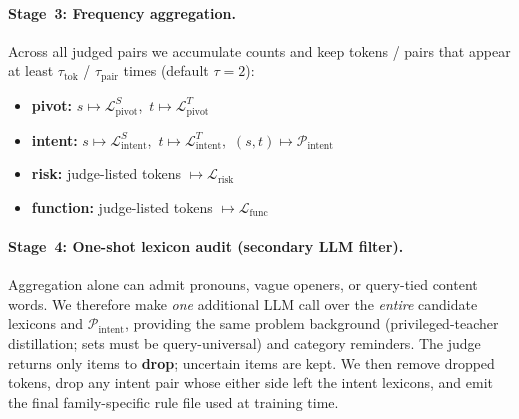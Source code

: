 \paragraph{Stage~3: Frequency aggregation.}
Across all judged pairs we accumulate counts and keep tokens / pairs that
appear at least $\tau_{\mathrm{tok}}$ / $\tau_{\mathrm{pair}}$ times
(default $\tau\!=\!2$):
\begin{itemize}[leftmargin=1.6em, topsep=3pt, itemsep=2pt, parsep=0pt]
  \item[\textbullet]
    \textbf{pivot:}
    $s\mapsto\mathcal{L}_{\mathrm{pivot}}^{S}$,\
    $t\mapsto\mathcal{L}_{\mathrm{pivot}}^{T}$
  \item[\textbullet]
    \textbf{intent:}
    $s\mapsto\mathcal{L}_{\mathrm{intent}}^{S}$,\
    $t\mapsto\mathcal{L}_{\mathrm{intent}}^{T}$,\
    $(s,t)\mapsto\mathcal{P}_{\mathrm{intent}}$
  \item[\textbullet]
    \textbf{risk:}
    judge-listed tokens $\mapsto\mathcal{L}_{\mathrm{risk}}$
  \item[\textbullet]
    \textbf{function:}
    judge-listed tokens $\mapsto\mathcal{L}_{\mathrm{func}}$
\end{itemize}

\paragraph{Stage~4: One-shot lexicon audit (secondary LLM filter).}
Aggregation alone can admit pronouns, vague openers, or query-tied content
words.
We therefore make \emph{one} additional LLM call over the \emph{entire}
candidate lexicons and $\mathcal{P}_{\mathrm{intent}}$, providing the same
problem background (privileged-teacher distillation; sets must be
query-universal) and category reminders.
The judge returns only items to \textbf{drop}; uncertain items are kept.
We then remove dropped tokens, drop any intent pair whose either side left the
intent lexicons, and emit the final family-specific rule file used at training
time.

